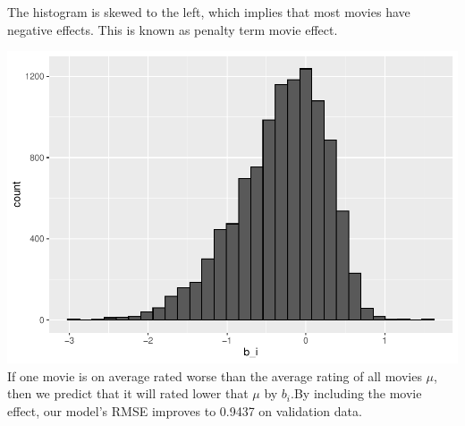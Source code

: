 \documentclass[]{article}
\newenvironment{Shaded}{\begin{snugshade}}{\end{snugshade}}
\newcommand{\DataTypeTok}[1]{\textcolor[rgb]{0.13,0.29,0.53}{#1}}
\newcommand{\DecValTok}[1]{\textcolor[rgb]{0.00,0.00,0.81}{#1}}
\newcommand{\KeywordTok}[1]{\textcolor[rgb]{0.13,0.29,0.53}{\textbf{#1}}}
\newcommand{\NormalTok}[1]{#1}
\newcommand{\OperatorTok}[1]{\textcolor[rgb]{0.81,0.36,0.00}{\textbf{#1}}}
\newcommand{\StringTok}[1]{\textcolor[rgb]{0.31,0.60,0.02}{#1}}
\begin{document}
The histogram is skewed to the left, which implies that most movies have
negative effects. This is known as penalty term movie effect.

\begin{Shaded}
\end{Shaded}

\includegraphics{Project_MovieLens_files/figure-latex/unnamed-chunk-25-1.pdf}
If one movie is on average rated worse than the average rating of all
movies \(\mu\), then we predict that it will rated lower that \(\mu\) by
\(b_{i}\).By including the movie effect, our model's RMSE improves to
0.9437 on validation data.

\begin{Shaded}
\end{Shaded}
\end{document}
